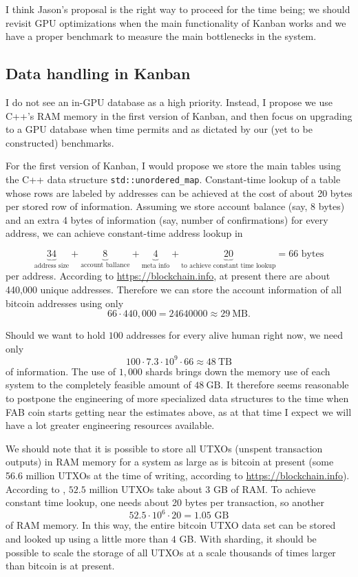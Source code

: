 \documentclass{article}
\begin{document}
I think Jason's proposal is the right way to proceed for the time being; we should revisit GPU optimizations when the main functionality of Kanban works and we have a proper benchmark to measure the main bottlenecks in the system. 

\subsection{Data handling in Kanban}
I do not see an in-GPU database as a high priority. Instead, I propose we use C++'s RAM memory in the first version of Kanban, and then focus on upgrading to a GPU database when time permits and as dictated by our (yet to be constructed) benchmarks. 

For the first version of Kanban, I would propose we store the main tables using the C++ data structure \verb|std::unordered_map|. Constant-time lookup of a table whose rows are labeled by addresses can be achieved at the cost of about 20 bytes per stored row of information. Assuming we store account balance (say, 8 bytes) and an extra 4 bytes of information (say, number of confirmations) for every address, we can achieve constant-time address lookup in 

\[
\underbrace{34}_{\text{address size}} + \underbrace{8}_{\text{account ballance}} + \underbrace{4}_{\text{meta info}} + \underbrace{20}_{\text{to achieve constant time lookup}} = 66 \text{ bytes}
\]
per address. According to \url{https://blockchain.info}, at present there are about 440,000 unique addresses. Therefore we can store the account information of all bitcoin addresses using only
\[
66\cdot 440,000 = 24640000 \approx 29~\text{MB}.
\]

Should we want to hold $100$ addresses for every alive human right now, we need only 
\[
100\cdot 7.3 \cdot 10^9 \cdot 66 \approx 48~\text{TB} 
\]
of information. The use of $1,000$ shards brings down the memory use of each system to the completely feasible amount of $48~\text{GB}$. It therefore seems reasonable to postpone the engineering of more specialized data structures to the time when FAB coin starts getting near the estimates above, as at that time I expect we will have a lot greater engineering resources available.


We should note that it is possible to store all UTXOs (unspent transaction outputs) in RAM memory for a system as large as is bitcoin at present (some 56.6 million UTXOs at the time of writing, according to \url{https://blockchain.info}). According to \cite{cryptoeprint:2017:analysisofbitcoinUTXOs}, $52.5$ million UTXOs take about $3$ GB of RAM. To achieve constant time lookup, one needs about 20 bytes per transaction, so another 
\[
52.5 \cdot 10^6 \cdot 20 = 1.05\text{~GB}
\]
of RAM memory. In this way, the entire bitcoin UTXO data set can be stored and looked up using a little more than $4$ GB. With sharding, it should be possible to scale the storage of all UTXOs at a scale thousands of times larger than bitcoin is at present.
\newpage




\end{document}
